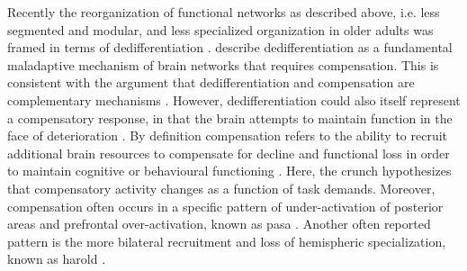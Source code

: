 \noindent Recently the reorganization of functional networks as described above, i.e. less segmented and modular, and less specialized organization in older adults was framed in terms of dedifferentiation \cite{Deery2023, Koen2019, Sala-Llonch2015}. \citeauthor{Fornito2015} \cite{Fornito2015} describe dedifferentiation as a fundamental maladaptive mechanism of brain networks that requires compensation. This is consistent with the argument that dedifferentiation and compensation are complementary mechanisms \cite{Reuter-Lorenz2010}. However, dedifferentiation could also itself represent a compensatory response, in that the brain attempts to maintain function in the face of deterioration \cite{Stern2009}. By definition compensation refers to the ability to recruit additional brain resources to compensate for decline and functional loss in order to maintain cognitive or behavioural functioning \cite{Reuter-Lorenz2010, Grady2012}. Here, the \gls{crunch} hypothesizes that compensatory activity changes as a function of task demands. Moreover, compensation often occurs in a specific pattern of under-activation of posterior areas and prefrontal over-activation, known as \gls{pasa} \cite{Davis2007}. Another often reported pattern is the more bilateral recruitment and loss of hemispheric specialization, known as \gls{harold} \cite{Cabeza2002}.

